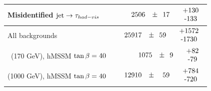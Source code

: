 \begin{table}
\begin{center}
{\begin{tabular}{| l| r |}
			Misidentified $\mbox{jet} \to \tau_{had-vis}$ & $\phantom{0}2506\phantom{.0}\pm\phantom{0}17\phantom{.0}\phantom{0}\begin{tabular}{c}+130 \\-133\end{tabular}$ \\ \hline
			\hline
			All backgrounds   & $25917\phantom{.0}\pm\phantom{0}59\phantom{.0}\phantom{0}\begin{tabular}{c}+1572 \\-1730\end{tabular}$  \\
			\hline
			\Hpm $\phantom{0}$(170 GeV), hMSSM $\tan\beta=40$ & $\phantom{0}1075\phantom{.0}\pm\phantom{0}9\phantom{.0}\phantom{0}\begin{tabular}{c}+82 \\-79\end{tabular}$  \\
			\Hpm (1000 GeV), hMSSM $\tan\beta=40$ & $\phantom{000}12910\phantom{0.}\pm\phantom{00}59\phantom{0.}\phantom{0}\begin{tabular}{c}+784 \\-720\end{tabular}$  \\
			\hline
			\end{tabular}}
			\end{center}
		\end{table}

